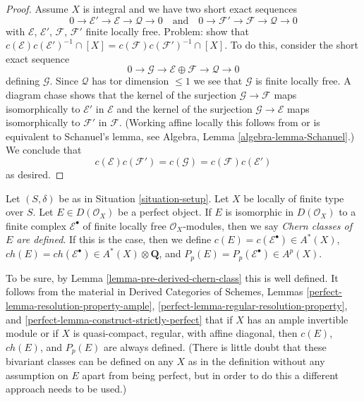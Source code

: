 \begin{proof}
\medskip\noindent
Assume $X$ is integral and we have two short exact sequences
$$
0 \to \mathcal{E}' \to \mathcal{E} \to \mathcal{Q} \to 0
\quad\text{and}\quad
0 \to \mathcal{F}' \to \mathcal{F} \to \mathcal{Q} \to 0
$$
with $\mathcal{E}$, $\mathcal{E}'$, $\mathcal{F}$, $\mathcal{F}'$
finite locally free. Problem: show that
$c(\mathcal{E})c(\mathcal{E}')^{-1} \cap [X] =
c(\mathcal{F})c(\mathcal{F}')^{-1} \cap [X]$.
To do this, consider the short exact sequence
$$
0 \to \mathcal{G} \to \mathcal{E} \oplus \mathcal{F} \to \mathcal{Q} \to 0
$$
defining $\mathcal{G}$. Since $\mathcal{Q}$ has tor dimension $\leq 1$
we see that $\mathcal{G}$ is finite locally free. A diagram chase
shows that the kernel of the surjection $\mathcal{G} \to \mathcal{F}$
maps isomorphically to $\mathcal{E}'$ in $\mathcal{E}$ and
the kernel of the surjection $\mathcal{G} \to \mathcal{E}$ maps
isomorphically to $\mathcal{F}'$ in $\mathcal{F}$. (Working affine
locally this follows from or is equivalent to Schanuel's lemma, see
Algebra, Lemma \ref{algebra-lemma-Schanuel}.)
We conclude that
$$
c(\mathcal{E})c(\mathcal{F}') = c(\mathcal{G}) =
c(\mathcal{F})c(\mathcal{E}')
$$
as desired.
\end{proof}

\begin{definition}
\label{definition-defined-on-perfect}
Let $(S, \delta)$ be as in Situation \ref{situation-setup}.
Let $X$ be locally of finite type over $S$. Let $E \in D(\mathcal{O}_X)$
be a perfect object. If $E$ is isomorphic in $D(\mathcal{O}_X)$
to a finite complex $\mathcal{E}^\bullet$ of finite locally free
$\mathcal{O}_X$-modules, then we say {\it Chern classes of $E$ are defined}.
If this is the case, then we define $c(E) = c(\mathcal{E}^\bullet) \in A^*(X)$,
$ch(E) = ch(\mathcal{E}^\bullet) \in A^*(X) \otimes \mathbf{Q}$, and
$P_p(E) = P_p(\mathcal{E}^\bullet) \in A^p(X)$.
\end{definition}

\noindent
To be sure, by Lemma \ref{lemma-pre-derived-chern-class} this is well defined.
It follows from the material in Derived Categories of Schemes,
Lemmas \ref{perfect-lemma-resolution-property-ample},
\ref{perfect-lemma-regular-resolution-property}, and
\ref{perfect-lemma-construct-strictly-perfect}
that if $X$ has an ample invertible module or if
$X$ is quasi-compact, regular, with affine diagonal, then
$c(E)$, $ch(E)$, and $P_p(E)$ are always defined. (There is little doubt
that these bivariant classes can be defined on any $X$ as in the
definition without any assumption
on $E$ apart from being perfect, but in order to do this a different
approach needs to be used.)

